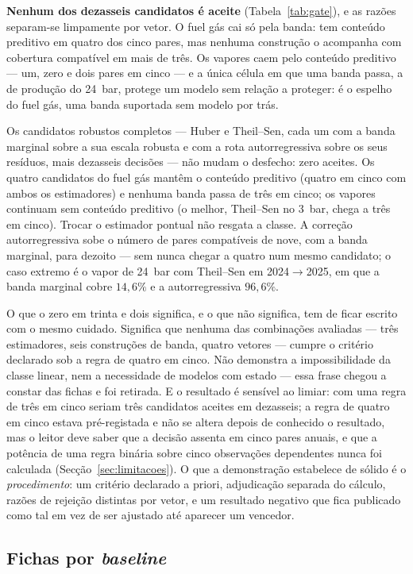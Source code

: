 \textbf{Nenhum dos dezasseis candidatos é aceite} (Tabela~\ref{tab:gate}), e
as razões separam-se limpamente por vetor. O fuel gás cai só pela banda:
tem conteúdo preditivo em quatro dos cinco pares, mas nenhuma construção o
acompanha com cobertura compatível em mais de três. Os vapores caem pelo
conteúdo preditivo --- um, zero e dois pares em cinco --- e a única célula
em que uma banda passa, a de produção do 24~bar, protege um modelo sem
relação a proteger: é o espelho do fuel gás, uma banda suportada sem modelo
por trás.

Os candidatos robustos completos --- Huber e Theil--Sen, cada um com a banda
marginal sobre a sua escala robusta e com a rota autorregressiva sobre os
seus resíduos, mais dezasseis decisões --- não mudam o desfecho: zero
aceites. Os quatro candidatos do fuel gás mantêm o conteúdo preditivo
(quatro em cinco com ambos os estimadores) e nenhuma banda passa de três em
cinco; os vapores continuam sem conteúdo preditivo (o melhor, Theil--Sen no
3~bar, chega a três em cinco). Trocar o estimador pontual não resgata a
classe. A correção autorregressiva sobe o número de pares compatíveis de
nove, com a banda marginal, para dezoito --- sem nunca chegar a quatro num
mesmo candidato; o caso extremo é o vapor de 24~bar com Theil--Sen em
2024${\to}$2025, em que a banda marginal cobre $14{,}6\%$ e a autorregressiva
$96{,}6\%$.

O que o zero em trinta e dois significa, e o que não significa, tem de ficar
escrito com o mesmo cuidado. Significa que nenhuma das combinações avaliadas
--- três estimadores, seis construções de banda, quatro vetores --- cumpre
o critério declarado sob a regra de quatro em cinco. Não demonstra a
impossibilidade da classe linear, nem a necessidade de modelos com estado
--- essa frase chegou a constar das fichas e foi retirada. E o resultado é
sensível ao limiar: com uma regra de três em cinco seriam três candidatos
aceites em dezasseis; a regra de quatro em cinco estava pré-registada e não
se altera depois de conhecido o resultado, mas o leitor deve saber que a
decisão assenta em cinco pares anuais, e que a potência de uma regra binária
sobre cinco observações dependentes nunca foi calculada (Secção~\ref{sec:limitacoes}).
O que a demonstração estabelece de sólido é o \emph{procedimento}: um
critério declarado a priori, adjudicação separada do cálculo, razões de
rejeição distintas por vetor, e um resultado negativo que fica publicado
como tal em vez de ser ajustado até aparecer um vencedor.

\subsection{Fichas por \emph{baseline}}
\label{sec:demo-fichas}

